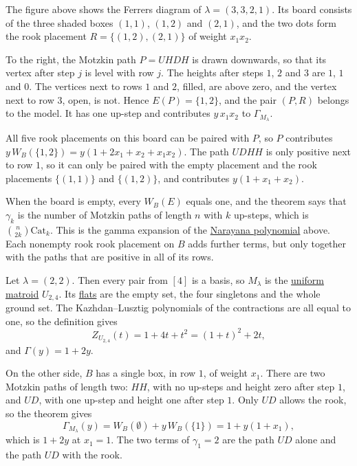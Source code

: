 \begin{example*}[A pair in the model for $\lambda=(3,3,2,1)$]
The figure above shows the Ferrers diagram of $\lambda=(3,3,2,1)$.  Its board
consists of the three shaded boxes $(1,1)$, $(1,2)$ and $(2,1)$, and the two
dots form the rook placement $R=\{(1,2),(2,1)\}$ of weight $x_1x_2$.

To the right, the Motzkin path $P=UHDH$ is drawn downwards, so that its vertex
after step $j$ is level with row $j$.  The heights after steps $1$, $2$ and
$3$ are $1$, $1$ and $0$.  The vertices next to rows $1$ and $2$, filled, are
above zero, and the vertex next to row $3$, open, is not.  Hence
$E(P)=\{1,2\}$, and the pair $(P,R)$ belongs to the model.  It has one
up-step and contributes $y\,x_1x_2$ to $\Gamma_{M_\lambda}$.

All five rook placements on this board can be paired with $P$, so $P$
contributes $y\,W_B(\{1,2\})=y(1+2x_1+x_2+x_1x_2)$.  The path $UDHH$ is only
positive next to row $1$, so it can only be paired with the empty placement
and the rook placements $\{(1,1)\}$ and $\{(1,2)\}$, and contributes
$y(1+x_1+x_2)$.
\end{example*}

When the board is empty, every $W_B(E)$ equals one, and the theorem says that
$\gamma_k$ is the number of Motzkin paths of length $n$ with $k$ up-steps,
which is $\binom{n}{2k}\mathrm{Cat}_k$.  This is the gamma expansion of the
\hyperref[narayanaNumbers]{Narayana polynomial} above.  Each nonempty rook
rook placement on $B$ adds further terms, but only together with the paths that
are positive in all of its rows.

\begin{example*}
Let $\lambda=(2,2)$.  Then every pair from $[4]$ is a basis, so $M_\lambda$ is
the \hyperref[matroidUniform]{uniform matroid} $U_{2,4}$.  Its
\hyperref[matroidFlat]{flats} are the empty set, the four singletons and the
whole ground set.  The Kazhdan--Lusztig polynomials of the contractions are
all equal to one, so the definition gives
\[
  Z_{U_{2,4}}(t)=1+4t+t^2=(1+t)^2+2t,
\]
and $\Gamma(y)=1+2y$.

On the other side, $B$ has a single box, in row $1$, of
weight $x_1$.  There are two Motzkin paths of length two: $HH$, with no
up-steps and height zero after step $1$, and $UD$, with one up-step and
height one after step $1$.  Only $UD$ allows the rook, so the theorem gives
\[
  \Gamma_{M_\lambda}(y)=W_B(\emptyset)+y\,W_B(\{1\})=1+y(1+x_1),
\]
which is $1+2y$ at $x_1=1$.  The two terms of $\gamma_1=2$ are the path $UD$
alone and the path $UD$ with the rook.
\end{example*}

